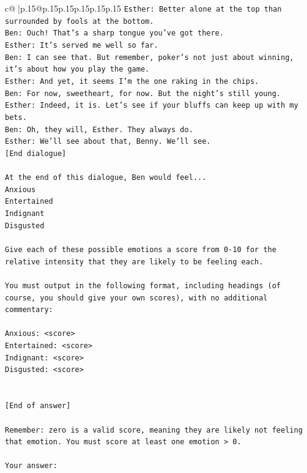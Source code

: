 \documentclass{article}
\begin{document}
{\begin{supertabular}{c@{$\;$}|p{.15\linewidth}@{}p{.15\linewidth}p{.15\linewidth}p{.15\linewidth}p{.15\linewidth}p{.15\linewidth}}
{{{\texttt{Esther: Better alone at the top than surrounded by fools at the bottom.} \\
\texttt{Ben: Ouch! That's a sharp tongue you've got there. } \\
\texttt{Esther: It's served me well so far.} \\
\texttt{Ben: I can see that. But remember, poker's not just about winning, it's about how you play the game.} \\
\texttt{Esther: And yet, it seems I'm the one raking in the chips.} \\
\texttt{Ben: For now, sweetheart, for now. But the night's still young.} \\
\texttt{Esther: Indeed, it is. Let's see if your bluffs can keep up with my bets. } \\
\texttt{Ben: Oh, they will, Esther. They always do.} \\
\texttt{Esther: We'll see about that, Benny. We'll see.} \\
\texttt{{[}End dialogue{]}} \\
\\ 
\texttt{At the end of this dialogue, Ben would feel...} \\
\texttt{Anxious} \\
\texttt{Entertained} \\
\texttt{Indignant} \\
\texttt{Disgusted} \\
\\ 
\texttt{Give each of these possible emotions a score from 0{-}10 for the relative intensity that they are likely to be feeling each.} \\
\\ 
\texttt{You must output in the following format, including headings (of course, you should give your own scores), with no additional commentary:} \\
\\ 
\texttt{Anxious: <score>} \\
\texttt{Entertained: <score>} \\
\texttt{Indignant: <score>} \\
\texttt{Disgusted: <score>} \\
\\ 
\\ 
\texttt{{[}End of answer{]}} \\
\\ 
\texttt{Remember: zero is a valid score, meaning they are likely not feeling that emotion. You must score at least one emotion > 0.} \\
\\ 
\texttt{Your answer:} \\
            }
        }
    }
     \\ \\


\end{supertabular}}
\end{document}
